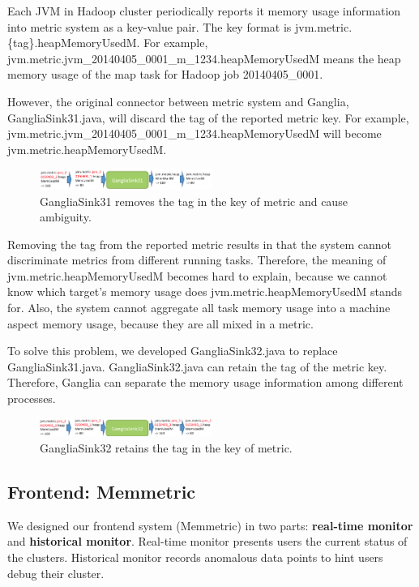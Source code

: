 Each JVM in Hadoop cluster periodically reports it memory usage information into metric system as a key-value pair. The key format is jvm.metric.\{tag\}.heapMemoryUsedM. For example, jvm.metric.jvm\_20140405\_0001\_m\_1234.heapMemoryUsedM means the heap memory usage of the map task for Hadoop job 20140405\_0001. 


However, the original connector between metric system and Ganglia, GangliaSink31.java, will discard the tag of the reported metric key. For example, jvm.metric.jvm\_20140405\_0001\_m\_1234.heapMemoryUsedM will become jvm.metric.heapMemoryUsedM. 

\begin{figure}[h!]
  \centering
    \includegraphics[width=0.5\textwidth]{image/ganglia31_flow.png}
  \caption{GangliaSink31 removes the tag in the key of metric and cause ambiguity.}
\end{figure}

Removing the tag from the reported metric results in that the system cannot discriminate metrics from different running tasks. Therefore, the meaning of jvm.metric.heapMemoryUsedM becomes hard to explain, because we cannot know which target's memory usage does  jvm.metric.heapMemoryUsedM stands for. Also, the system cannot aggregate all task memory usage into a machine aspect memory usage, because they are all mixed in a metric. 

To solve this problem, we developed GangliaSink32.java to replace GangliaSink31.java. GangliaSink32.java can retain the tag of the metric key. Therefore, Ganglia can separate the memory usage information among different processes. 

\begin{figure}[h!]
  \centering
  \includegraphics[width=0.5\textwidth]{image/ganglia32_flow.png}
  \caption{GangliaSink32 retains the tag in the key of metric.}
\end{figure}

\subsection{Frontend: Memmetric}
We designed our frontend system (Memmetric) in two parts: \textbf{real-time monitor} and \textbf{historical monitor}. Real-time monitor  presents users the current status of the clusters. Historical monitor records anomalous data points to hint users debug their cluster.

